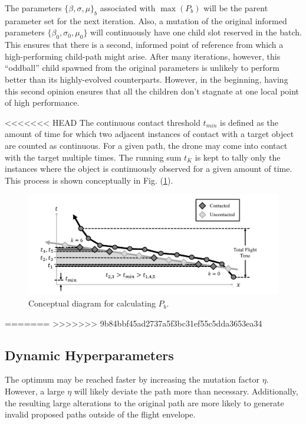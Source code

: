 \documentclass[conf]{new-aiaa}
\begin{document}
The parameters ${\{\beta, \sigma, \mu\}}_b$ associated with $\max({P_b})$ will be the parent parameter set for the next iteration. Also, a mutation of the original informed parameters $\{\beta_0, \sigma_0, \mu_0\}$ will continuously have one child slot reserved in the batch. This ensures that there is a second, informed point of reference from which a high-performing child-path might arise. After many iterations, however, this ``oddball'' child spawned from the original parameters is unlikely to perform better than its highly-evolved counterparts. However, in the beginning, having this second opinion ensures that all the children don't stagnate at one local point of high performance.

<<<<<<< HEAD
The continuous contact threshold $t_{min}$ is defined as the amount of time for which two adjacent instances of contact with a target object are counted as continuous. For a given path, the drone may come into contact with the target multiple times. The running sum $t_K$ is kept to tally only the instances where the object is continuously observed for a given amount of time. This process is shown conceptually in Fig. (\ref{performance-calc}).

\begin{figure}[hbt!]
\centering
\includegraphics[width=1\textwidth]{figs/performance-calc}
\caption{Conceptual diagram for calculating $P_b$.}
\label{performance-calc}
\end{figure}

=======
>>>>>>> 9b84bbf45ad2737a5f3bc31ef55c5dda3653ea34

\subsection{Dynamic Hyperparameters}
The optimum may be reached faster by increasing the mutation factor $\eta$. However, a large $\eta$ will likely deviate the path more than necessary. Additionally, the resulting large alterations to the original path are more likely to generate invalid proposed paths outside of the flight envelope.
\end{document}
